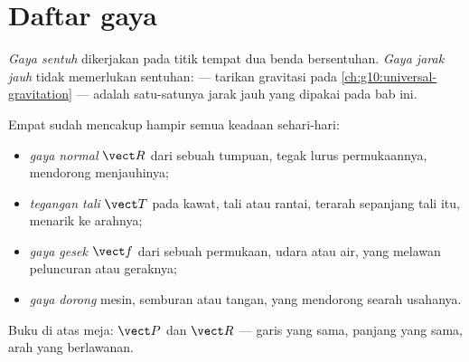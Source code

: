 \section{Daftar gaya}

\begin{definition}\label{def:g10:inertia:contact}
\emph{Gaya sentuh} dikerjakan pada titik tempat dua
benda bersentuhan. \emph{Gaya jarak jauh} tidak
memerlukan sentuhan:  --- tarikan gravitasi pada
\cref{ch:g10:universal-gravitation} --- adalah satu-satunya  jarak
jauh yang dipakai pada bab ini.
\end{definition}

\begin{definition}\label{def:g10:inertia:inventory}
Empat  sudah mencakup hampir semua keadaan sehari-hari:
\begin{itemize}
  \item \emph{gaya normal} $\vect R$ dari sebuah
        tumpuan, tegak lurus permukaannya, mendorong menjauhinya;
  \item \emph{tegangan tali} $\vect T$ pada kawat,
        tali atau rantai, terarah sepanjang tali itu, menarik ke
        arahnya;
  \item \emph{gaya gesek} $\vect f$ dari sebuah
        permukaan, udara atau air, yang melawan peluncuran atau
        geraknya;
  \item \emph{gaya dorong} mesin, semburan atau
        tangan, yang mendorong searah usahanya.
\end{itemize}
\end{definition}

\begin{omfigure}

{\small Buku di atas meja:  $\vect P$ dan  $\vect R$ ---
garis yang sama, panjang yang sama, arah yang berlawanan.}
\end{omfigure}

